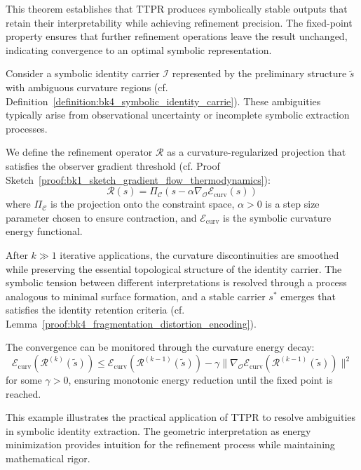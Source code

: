 This theorem establishes that TTPR produces symbolically stable outputs that retain their interpretability while achieving refinement precision. The fixed-point property ensures that further refinement operations leave the result unchanged, indicating convergence to an optimal symbolic representation.

\begin{demonstratio}
\label{example:bk4_ttpr_identity_refinement}
Consider a symbolic identity carrier $\mathcal{I}$ represented by the preliminary structure $\tilde{s}$ with ambiguous curvature regions (cf. Definition~\ref{definition:bk4_symbolic_identity_carrie}). These ambiguities typically arise from observational uncertainty or incomplete symbolic extraction processes.

We define the refinement operator $\mathcal{R}$ as a curvature-regularized projection that satisfies the observer gradient threshold (cf. Proof Sketch~\ref{proof:bk1_sketch_gradient_flow_thermodynamics}):
\[
\mathcal{R}(s) = \Pi_{\mathcal{C}} \left( s - \alpha \nabla_{\mathcal{O}} \mathcal{E}_{\text{curv}}(s) \right)
\]
where $\Pi_{\mathcal{C}}$ is the projection onto the constraint space, $\alpha > 0$ is a step size parameter chosen to ensure contraction, and $\mathcal{E}_{\text{curv}}$ is the symbolic curvature energy functional.

After $k \gg 1$ iterative applications, the curvature discontinuities are smoothed while preserving the essential topological structure of the identity carrier. The symbolic tension between different interpretations is resolved through a process analogous to minimal surface formation, and a stable carrier $s^*$ emerges that satisfies the identity retention criteria (cf. Lemma~\ref{proof:bk4_fragmentation_distortion_encoding}).

The convergence can be monitored through the curvature energy decay:
\[
\mathcal{E}_{\text{curv}}(\mathcal{R}^{(k)}(\tilde{s})) \le \mathcal{E}_{\text{curv}}(\mathcal{R}^{(k-1)}(\tilde{s})) - \gamma \|\nabla_{\mathcal{O}} \mathcal{E}_{\text{curv}}(\mathcal{R}^{(k-1)}(\tilde{s}))\|^2
\]
for some $\gamma > 0$, ensuring monotonic energy reduction until the fixed point is reached.
\end{demonstratio}

This example illustrates the practical application of TTPR to resolve ambiguities in symbolic identity extraction. The geometric interpretation as energy minimization provides intuition for the refinement process while maintaining mathematical rigor.

